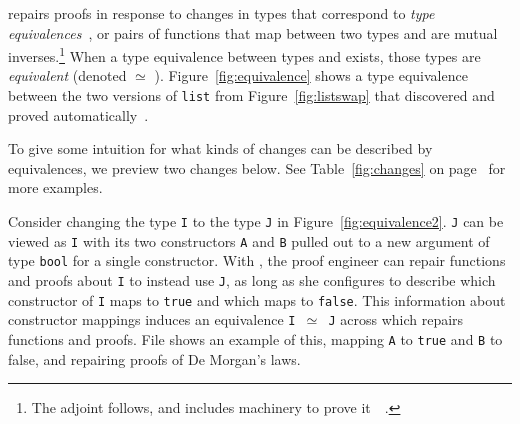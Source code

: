 \toolname repairs proofs in response to changes in types that correspond to \textit{type equivalences}~\cite{univalent2013homotopy},
or pairs of functions that map between two types and are mutual inverses.\footnote{The adjoint follows, and \toolname includes machinery to prove it~\href{https://github.com/uwplse/pumpkin-pi/blob/v2.0.0/plugin/src/automation/search/equivalence.ml}{}~\href{https://github.com/uwplse/pumpkin-pi/blob/v2.0.0/plugin/theories/Adjoint.v}{}.}
When a type equivalence between types \A and \B exists, those types are \textit{equivalent} (denoted \A $\simeq$ \B). %
Figure~\ref{fig:equivalence} shows a type equivalence between the two versions of \lstinline{list}
from Figure~\ref{fig:listswap} that \toolname discovered and proved automatically~\href{https://github.com/uwplse/pumpkin-pi/blob/v2.0.0/plugin/coq/Swap.v}{}.

%

To give some intuition for what kinds of changes can be described by equivalences, we preview two changes below.
See Table~\ref{fig:changes} on page~\pageref{fig:changes} for more examples.

Consider changing the type \lstinline{I} to the type \lstinline{J} 
in Figure~\ref{fig:equivalence2}.
\lstinline{J} can be viewed as \lstinline{I} with its two constructors \lstinline{A} and \lstinline{B} pulled out to a
new argument of type \lstinline{bool} for a single constructor.
With \toolname, the proof engineer can repair functions and proofs about \lstinline{I} to instead use \lstinline{J},
as long as she configures \toolname to describe which constructor 
of \lstinline{I} maps to \lstinline{true} and which maps to \lstinline{false}.
This information about constructor mappings induces an equivalence \lstinline{I }$\simeq$\lstinline{ J}
across which \toolname repairs functions and proofs.
File \href{https://github.com/uwplse/pumpkin-pi/blob/v2.0.0/plugin/coq/playground/constr_refactor.v}{} shows an example of this, mapping \lstinline{A} to \lstinline{true} and \lstinline{B} to false,
and repairing proofs of De Morgan's laws. %
%

